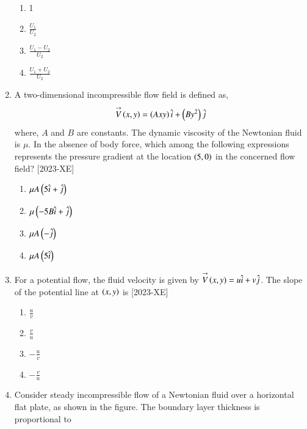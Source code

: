\documentclass[journal]{IEEEtran}
\begin{document}
\begin{enumerate}[start=27]
\begin{figure}[H]
			\centering
			
			\label{31}
		\end{figure}
\begin{enumerate}
    \item 1\\
    \item $\frac{U_1}{U_2}$\\
    \item $\frac{U_1 - U_2}{U_2}$\\
    \item $\frac{U_1 + U_2}{U_2}$\\
\end{enumerate}  
\item A two-dimensional incompressible flow field is defined as, \\
\begin{align*}
    \overset{\rightarrow}{V} \left(x,y\right) = \left(Axy\right) \hat{i} + \left(By^2\right) \hat{j}
\end{align*}
where, $A$ and $B$ are constants. The dynamic viscosity of the Newtonian fluid is $\mu$. In the absence of body force, which among the following expressions represents the pressure gradient at the location $\left(5,0\right)$ in the concerned flow field? \hfill{[2023-XE]}\\
\begin{enumerate}
    \item $\mu A \left(5 \hat{i}+\hat{j}\right)$\\
    \item $\mu \left(-5B \hat{i}+\hat{j}\right)$\\
    \item $\mu A \left(-\hat{j}\right)$\\
    \item $\mu A \left(5 \hat{i}\right)$
\end{enumerate}
\item For a potential flow, the fluid velocity is given by $\overset{\rightarrow}{V} \left(x,y\right)=u \hat{i}+v \hat{j}$. The slope of the potential line at $\left(x,y\right)$ is \hfill{[2023-XE]}\\
\begin{enumerate}
    \item $\frac{u}{v}$\\
    \item $\frac{v}{u}$\\
    \item $-\frac{u}{v}$\\
    \item $-\frac{v}{u}$\\
\end{enumerate}
\item Consider steady incompressible flow of a Newtonian fluid over a horizontal flat plate, as shown in the figure. The boundary layer thickness is proportional to 


\end{enumerate}
\end{document}

